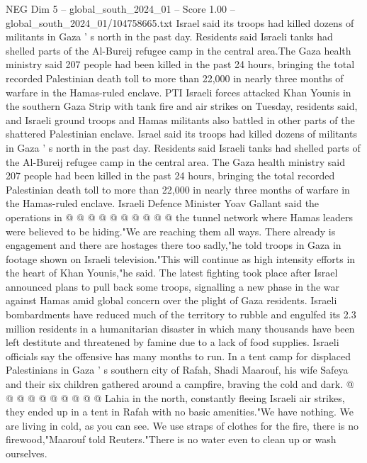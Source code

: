 \begin{textsample}{NEG Dim 5 – global\_south\_2024\_01 – Score 1.00 – global\_south\_2024\_01/104758665.txt}  \label{ex:f5_neg_449}
Israel said its troops had killed dozens of militants in Gaza ' s north in the past day.
Residents said Israeli tanks had shelled parts of the Al-Bureij refugee camp in the central area.The Gaza health ministry said 207 people had been killed in the past 24 hours, bringing the total recorded Palestinian death toll to more than 22,000 in nearly three months of warfare in the Hamas-ruled enclave.
PTI Israeli forces attacked Khan Younis in the southern Gaza Strip with tank fire and air strikes on Tuesday, residents said, and Israeli ground troops and Hamas militants also battled in other parts of the shattered Palestinian enclave.
Israel said its troops had killed dozens of militants in Gaza ' s north in the past day.
Residents said Israeli tanks had shelled parts of the Al-Bureij refugee camp in the central area.
The Gaza health ministry said 207 people had been killed in the past 24 hours, bringing the total recorded Palestinian death toll to more than 22,000 in nearly three months of warfare in the Hamas-ruled enclave.
Israeli Defence Minister Yoav Gallant said the operations in @ @ @ @ @ @ @ @ @ @ the tunnel network where Hamas leaders were believed to be hiding."We are reaching them all ways.
There already is engagement and there are hostages there too sadly,"he told troops in Gaza in footage shown on Israeli television."This will continue as high intensity efforts in the heart of Khan Younis,"he said.
The latest fighting took place after Israel announced plans to pull back some troops, signalling a new phase in the war against Hamas amid global concern over the plight of Gaza residents.
Israeli bombardments have reduced much of the territory to rubble and engulfed its 2.3 million residents in a humanitarian disaster in which many thousands have been left destitute and threatened by famine due to a lack of food supplies.
Israeli officials say the offensive has many months to run.
In a tent camp for displaced Palestinians in Gaza ' s southern city of Rafah, Shadi Maarouf, his wife Safeya and their six children gathered around a campfire, braving the cold and dark. @ @ @ @ @ @ @ @ @ @ Lahia in the north, constantly fleeing Israeli air strikes, they ended up in a tent in Rafah with no basic amenities."We have nothing.
We are living in cold, as you can see.
We use straps of clothes for the fire, there is no firewood,"Maarouf told Reuters."There is no water even to clean up or wash ourselves.

\end{textsample}
